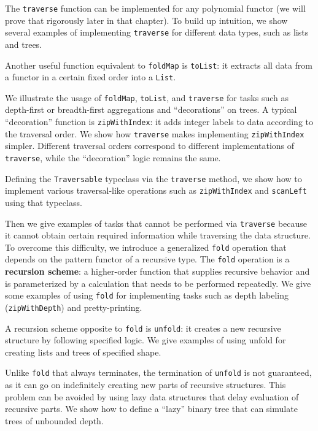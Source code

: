 The \lstinline!traverse! function can be implemented for any polynomial
functor (we will prove that rigorously later in that chapter). To
build up intuition, we show several examples of implementing \lstinline!traverse!
for different data types, such as lists and trees.

Another useful function equivalent to \lstinline!foldMap! is \lstinline!toList!:
it extracts all data from a functor in a certain fixed order into
a \lstinline!List!.

We illustrate the usage of \lstinline!foldMap!, \lstinline!toList!,
and \lstinline!traverse! for tasks such as depth-first or breadth-first
aggregations and \textsf{``}decorations\textsf{''} on trees. A typical \textsf{``}decoration\textsf{''}
function is \lstinline!zipWithIndex!: it adds integer labels to data
according to the traversal order. We show how \lstinline!traverse!
makes implementing \lstinline!zipWithIndex! simpler. Different traversal
orders correspond to different implementations of \lstinline!traverse!,
while the \textsf{``}decoration\textsf{''} logic remains the same.

Defining the \lstinline!Traversable! typeclass via the \lstinline!traverse!
method, we show how to implement various traversal-like operations
such as \lstinline!zipWithIndex! and \lstinline!scanLeft! using
that typeclass.

Then we give examples of tasks that cannot be performed via \lstinline!traverse!
because it cannot obtain certain required information while traversing
the data structure. To overcome this difficulty, we introduce a generalized
\lstinline!fold! operation that depends on the pattern functor of
a recursive type. The \lstinline!fold! operation is a \textbf{recursion
scheme}: a higher-order function that supplies
recursive behavior and is parameterized by a calculation that needs
to be performed repeatedly. We give some examples of using \lstinline!fold!
for implementing tasks such as depth labeling (\lstinline!zipWithDepth!)
and pretty-printing.

A recursion scheme opposite to \lstinline!fold! is \lstinline!unfold!:
it creates a new recursive structure by following specified logic.
We give examples of using unfold for creating lists and trees of specified
shape.

Unlike \lstinline!fold! that always terminates, the termination of
\lstinline!unfold! is not guaranteed, as it can go on indefinitely
creating new parts of recursive structures. This problem can be avoided
by using lazy data structures that delay evaluation of recursive parts.
We show how to define a \textsf{``}lazy\textsf{''} binary tree that can simulate trees
of unbounded depth.

